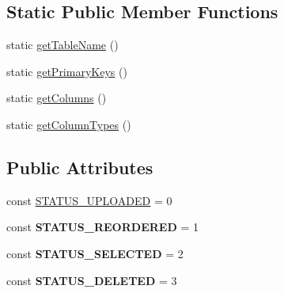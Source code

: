 \subsection*{Static Public Member Functions}
\begin{DoxyCompactItemize}
\item 
static \hyperlink{classBinding_aee5dd30aab182b19046ab5164da4c649}{getTableName} ()
\item 
static \hyperlink{classBinding_ac7539d5770936644b98be102ed66a4e5}{getPrimaryKeys} ()
\item 
static \hyperlink{classBinding_a4caf9958cba0f34b8b08aae313afc9ec}{getColumns} ()
\item 
static \hyperlink{classBinding_aded437d056ec24770d8bf4eebdeec36e}{getColumnTypes} ()
\end{DoxyCompactItemize}
\subsection*{Public Attributes}
\begin{DoxyCompactItemize}
\item 
const \hyperlink{classBinding_a501dc5e8d8952bcbd5d022a299c416fd}{STATUS\_\-UPLOADED} = 0
\item 
\hypertarget{classBinding_ab7bcbaf41004f7eb5df3fee0316f0be1}{
const {\bfseries STATUS\_\-REORDERED} = 1}
\label{classBinding_ab7bcbaf41004f7eb5df3fee0316f0be1}

\item 
\hypertarget{classBinding_a4cd41675d4a2d1683981fce67de2b641}{
const {\bfseries STATUS\_\-SELECTED} = 2}
\label{classBinding_a4cd41675d4a2d1683981fce67de2b641}

\item 
\hypertarget{classBinding_a1f7764fe42804772f01231d3b8938beb}{
const {\bfseries STATUS\_\-DELETED} = 3}
\label{classBinding_a1f7764fe42804772f01231d3b8938beb}

\end{DoxyCompactItemize}
